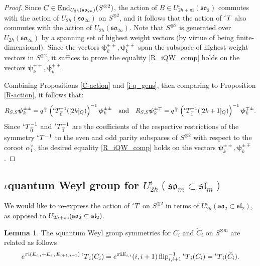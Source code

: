 \documentclass[10pt]{amsart}
\numberwithin{equation}{section}
\theoremstyle{definition}
\newtheorem{lemma}[theorem]{Lemma}
\newcommand{\End}{{\rm End}}
\newcommand{\slm}{\mathfrak{sl}_{m}}
\newcommand{\son}[1][2n]{\mathfrak{so}_{#1}}
\newcommand{\som}[1][m]{\mathfrak{so}_{#1}}
\newcommand{\ot}{\otimes}
\newcommand{\flip}{\operatorname{flip}}
\newcommand{\iQW}{\prescript{\iota}{}{T}}
\newcommand{\imag}{\textbf{i}}
\newcommand{\hwp}{\boldsymbol{\psi}}
\begin{document}
\begin{proof}
Since $C\in \End_{U_{2h}(\son)}(S^{\otimes 2})$, the action of $B\in U^{\iota}_{2h+\pi \imag}(\mathfrak{so}_2)$ commutes with the action of $U_{2h}(\son)$ on $S^{\ot 2}$, and it follows that the action of $\iQW$ also commutes with the action of $U_{2h}(\son)$. Note that $S^{\otimes 2}$ is generated over $U_{2h}(\son)$ by a spanning set of highest weight vectors (by virtue of being finite-dimensional). Since the vectors $\hwp_k^{\pm\pm},\hwp_k^{\pm\mp}$ span the subspace of highest weight vectors in $S^{\ot 2}$, it suffices to prove the equality \eqref{R_iQW_comp} holds on the vectors $\hwp_k^{\pm\pm},\hwp_k^{\pm\mp}$.

Combining Propositions \ref{C-action} and \ref{i-q_gens}, then comparing to Proposition \ref{R-action}, it follows that:
    \begin{equation}\label{R_iQW_hr_comp}
    R_{S,S}\hwp_k^{\pm \pm}= q^{\frac{n}{2}}\left(\iQW^{-1}_{\overline{0}} ([2k]_{Q})\right)^{-1}\hwp_k^{\pm \pm} \quad \text{and} \quad  R_{S,S}\hwp_k^{\pm \mp}= q^{\frac{n}{2}} \left(\iQW^{-1}_{\overline{1}}([2k+1]_{Q})\right)^{-1}\hwp_k^{\mp \pm}.
\end{equation}
Since $\iQW^{-1}_{\overline{0}}$ and $\iQW^{-1}_{\overline{1}}$ are the coefficients of the respective restrictions of the symmetry $\iQW^{-1}$ to the even and odd parity subspaces of $S^{\ot 2}$ with respect to the coroot $\alpha_1^{\vee}$, the desired equality \eqref{R_iQW_comp} holds on the vectors $\hwp_k^{\pm\pm},\hwp_k^{\pm\mp}$.
\end{proof}

\subsection{$\iota$quantum Weyl group for $U_{2h}^{\iota}(\som\subset \slm)$}\label{subsec:iquantumWeyl}

We would like to re-express the action of $\iQW$ on $S^{\otimes 2}$ in terms of $U_{2h}^{\iota}(\som[2]\subset \mathfrak{sl}_2)$, as opposed to $U_{2h+\pi {\bf i}}(\mathfrak{so}_2 \subset \mathfrak{sl}_2)$.

\begin{lemma}\label{iQW_pm_q2}
    The $\iota$quantum Weyl group symmetries for $C_i$ and $\widetilde{C}_i$ on $S^{\ot m}$ are related as follows
    \[
        e^{\pi {\rm i}(E_{i,i}+E_{i,i}E_{i+1,i+1})}\iQW_i(C_i)= e^{\pi {\bf i}E_{i,i}}(i,i+1)\flip^{-1}_{i,i+1} \iQW_i(C_i)=\iQW_i(\widetilde{C}_i). 
    \]
\end{lemma}
\end{document}
